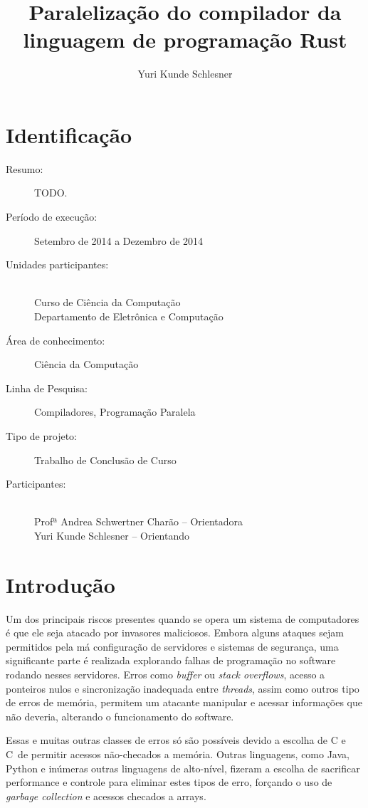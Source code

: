 \documentclass[12pt]{article}
\title{Paralelização do compilador da linguagem de programação Rust}
\author{Yuri Kunde Schlesner}
\def\Cpp{{C\nolinebreak[4]\hspace{-.05em}\raisebox{.4ex}{\tiny\bf ++}}}
\newcommand{\todo}[1]{\textsf{\color{red}#1}}
\begin{document}
\maketitle

\section{Identificação}

\begin{description}
	\item[Resumo:] \todo{TODO.}
	\item[Período de execução:] Setembro de 2014 a Dezembro de 2014
	\item[Unidades participantes:] ~\\ Curso de Ciência da Computação \\ Departamento de Eletrônica e Computação
	\item[Área de conhecimento:] Ciência da Computação
	\item[Linha de Pesquisa:] Compiladores, Programação Paralela
	\item[Tipo de projeto:] Trabalho de Conclusão de Curso
	\item[Participantes:] ~\\ Profª Andrea Schwertner Charão -- Orientadora \\ Yuri Kunde Schlesner -- Orientando
\end{description}

\section{Introdução}

Um dos principais riscos presentes quando se opera um sistema de computadores é que ele seja atacado por invasores maliciosos. Embora alguns ataques sejam permitidos pela má configuração de servidores e sistemas de segurança, uma significante parte é realizada explorando falhas de programação no software rodando nesses servidores. Erros como \emph{buffer} ou \emph{stack overflows}, acesso a ponteiros nulos e sincronização inadequada entre \emph{threads}, assim como outros tipo de erros de memória, permitem um atacante manipular e acessar informações que não deveria, alterando o funcionamento do software. 

Essas e muitas outras classes de erros só são possíveis devido a escolha de C e \Cpp\ de permitir acessos não-checados a memória. Outras linguagens, como Java, Python e inúmeras outras linguagens de alto-nível, fizeram a escolha de sacrificar performance e controle para eliminar estes tipos de erro, forçando o uso de \emph{garbage collection} e acessos checados a arrays.
\end{document}
